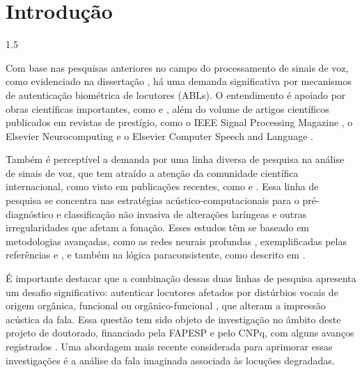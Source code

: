 \documentclass[a4paper,12pt,openright,oneside]{book}
\newenvironment{myenv}[1]
  {\begin{spacing}{#1}}
  {\end{spacing}}
\begin{document}
	\chapter{Introdução}
		\begin{myenv}{1.5}
			\setcounter{page}{12}
			\par Com base nas pesquisas anteriores no campo do processamento de sinais de voz, como evidenciado na dissertação \cite{furlan2021caracterizacao}, há uma demanda significativa por mecanismos de autenticação biométrica de locutores (ABLs). O entendimento é apoiado por obras científicas importantes, como \cite{beigi2011speaker} e \cite{neustein2012forensic}, além do volume de artigos científicos publicados em revistas de prestígio, como o IEEE Signal Processing Magazine \cite{hansen2015speaker}, o Elsevier Neurocomputing \cite{wang2022racp} e o Elsevier Computer Speech and Language \cite{lee2020two}.
			
			\par Também é perceptível a demanda por uma linha diversa de pesquisa na análise de sinais de voz, que tem atraído a atenção da comunidade científica internacional, como visto em publicações recentes, como \cite{chaiani2022voice} e \cite{fujimura2022classification}. Essa linha de pesquisa se concentra nas estratégias acústico-computacionais para o pré-diagnóstico e classificação não invasiva de alterações laríngeas e outras irregularidades que afetam a fonação. Esses estudos têm se baseado em metodologias avançadas, como as redes neurais profundas \cite{goodfellow2016deep}, exemplificadas pelas referências \cite{mittal2021deep} e \cite{miliaresi2021combining}, e também na lógica paraconsistente, como descrito em \cite{fonseca2017linear}.
			
			\par É importante destacar que a combinação dessas duas linhas de pesquisa apresenta um desafio significativo: autenticar locutores afetados por distúrbios vocais de origem orgânica, funcional ou orgânico-funcional \cite{le2005voz} \cite{le2005voz2}, que alteram a impressão acústica da fala. Essa questão tem sido objeto de investigação no âmbito deste projeto de doutorado, financiado pela FAPESP e pelo CNPq, com alguns avanços registrados \cite{gupta2021residual}. Uma abordagem mais recente considerada para aprimorar essas investigações é a análise da fala imaginada \cite{moctezuma2019subjects} associada às locuções degradadas.
			

\end{myenv}
\end{document}
